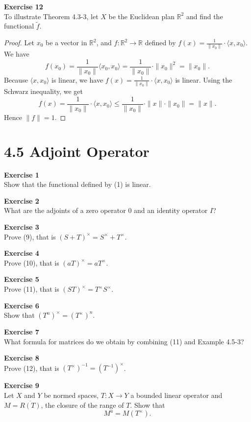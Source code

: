 \documentclass[12pt, a4paper]{article}
\theoremstyle{plain}
\newcommand{\R}{\mathbb{R}}
\newenvironment{exercise}[2][Exercise]
    { \begin{mdframed}[backgroundcolor=gray!20] \textbf{#1 #2} \\}
    {  \end{mdframed}}
\begin{document}
\begin{exercise}{12}
To illustrate Theorem 4.3-3, let $X$ be the Euclidean plan $\R^2$ and find the functional $\tilde{f}$.
\end{exercise}
	\begin{proof}
	Let $x_0$ be a vector in $\R^2$, and $f:\R^2\rightarrow \R$ defined by $f(x)=\frac{1}{\|x_0\|}\cdot\langle{x,x_0}\rangle$. We have
	\[
	f(x_0)=\frac{1}{\|x_0\|}\langle{x_0,x_0}\rangle = \frac{1}{\|x_0\|}\cdot\|x_0\|^2 = \|x_0\|.
	\]
	Because $\langle{x,x_0}\rangle$ is linear, we have $f(x)=\frac{1}{\|x_0\|}\cdot\langle{x,x_0}\rangle$ is linear. Using the Schwarz inequality, we get
	\[
	f(x) = \frac{1}{\|x_0\|}\cdot\langle{x,x_0}\rangle\leq \frac{1}{\|x_0\|}\cdot \|x\|\cdot \|x_0\| = \|x\|.
	\]
	Hence $\|f\|=1$.
	\end{proof}
	
	
\section*{4.5 Adjoint Operator}

\begin{exercise}{1}
Show that the functional defined by (1) is linear.
\end{exercise}

\begin{exercise}{2}
What are the adjoints of a zero operator $0$ and an identity operator $I$?
\end{exercise}

\begin{exercise}{3}
Prove (9), that is $(S+T)^\times = S^\times + T^\times$.
\end{exercise}

\begin{exercise}{4}
Prove (10), that is $(aT)^\times = aT^\times$.
\end{exercise}

\begin{exercise}{5}
Prove (11), that is $(ST)^\times = T^\times S^\times$.
\end{exercise}

\begin{exercise}{6}
Show that $(T^n)^\times = (T^\times)^n$.
\end{exercise}

\begin{exercise}{7}
What formula for matrices do we obtain by combining (11) and Example 4.5-3?
\end{exercise}

\begin{exercise}{8}
Prove (12), that is $(T^\times)^{-1} = (T^{-1})^\times$.
\end{exercise}

\begin{exercise}{9}
Let $X$ and $Y$ be normed spaces, $T:X\rightarrow Y$ a bounded linear operator and $M=\overline{R(T)}$, the closure of the range of $T$. Show that 
\[
M^a = M(T^\times).
\]
\end{exercise}
\end{document}
